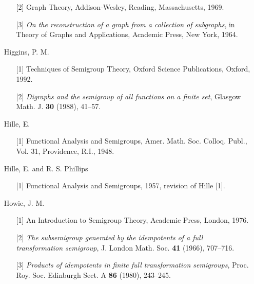\documentclass{surv-l}
\numberwithin{equation}{section}
\numberwithin{table}{section}
\numberwithin{figure}{section}
\theoremstyle{definition}
\begin{document}
\begin{enumerate}
\begin{enumerate}
\item[\hypertarget{bib27a}{[2]}] Graph Theory, Addison-Wesley, Reading, Massachusetts,
1969.

\item[\hypertarget{bib27b}{[3]}] \emph{On the reconstruction of a graph from a collection
of subgraphs}, in Theory of Graphs and Applications,
Academic Press, New York, 1964.
\end{enumerate}

\item[] Higgins, P. M.
\begin{enumerate}
\item[\hypertarget{bib28}{[1]}] Techniques of Semigroup Theory, Oxford Science
Publications, Oxford, 1992.

\item[\hypertarget{bib28a}{[2]}] \emph{Digraphs and the semigroup of all functions on
a finite set}, Glasgow Math. J. \textbf{30} (1988),
41--57.
\end{enumerate}

\item[] Hille, E.
\begin{enumerate}
\item[\hypertarget{bib29}{[1]}] Functional Analysis and Semigroups, Amer. Math. Soc.
Colloq. Publ., Vol. 31, Providence, R.I., 1948.
\end{enumerate}

\item[] Hille, E. and R. S. Phillips
\begin{enumerate}
\item[\hypertarget{bib30}{[1]}] Functional Analysis and Semigroups, 1957, revision of
Hille [1].
\end{enumerate}

\item[] Howie, J. M.
\begin{enumerate}
\item[\hypertarget{bib31}{[1]}] An Introduction to Semigroup Theory, Academic Press,
London, 1976.

\item[\hypertarget{bib31a}{[2]}] \emph{The subsemigroup generated by the idempotents of
a full transformation semigroup}, J. London Math. Soc.
\textbf{41} (1966), 707--716.

\item[\hypertarget{bib31b}{[3]}] \emph{Products of idempotents in finite full
transformation semigroups}, Proc. Roy. Soc. Edinburgh
Sect. A \textbf{86} (1980), 243--245.


\end{enumerate}
\end{enumerate}
\end{document}
